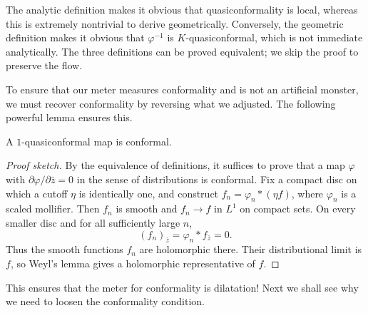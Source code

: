 \documentclass[11pt,a4paper]{article}
\begin{document}
The analytic definition makes it obvious that quasiconformality is local, whereas this is extremely nontrivial to derive geometrically. Conversely, the geometric definition makes it obvious that \(\varphi^{-1}\) is \(K\)-quasiconformal, which is not immediate analytically.
The three definitions can be proved equivalent; we skip the proof to preserve the flow.

To ensure that our meter measures conformality and is not an artificial monster, we must recover conformality by reversing what we adjusted. The following powerful lemma ensures this.
\setcounter{theorem}{39}\begin{lemma}
A \(1\)-quasiconformal map is conformal.
\end{lemma}
\begin{proof}[Proof sketch]
By the equivalence of definitions, it suffices to prove that a map \(\varphi\) with \(\partial\varphi/\partial\bar z=0\) in the sense of distributions is conformal. Fix a compact disc on which a cutoff \(\eta\) is identically one, and construct
\(f_n=\varphi_n*(\eta f)\), where \(\varphi_n\) is a scaled mollifier. Then \(f_n\) is smooth and \(f_n\to f\) in \(L^1\) on compact sets. On every smaller disc and for all sufficiently large \(n\),
\[
(f_n)_{\bar z}=\varphi_n*f_{\bar z}=0.
\]
Thus the smooth functions \(f_n\) are holomorphic there. Their distributional limit is \(f\), so Weyl's lemma gives a holomorphic representative of \(f\).
\end{proof}

This ensures that the meter for conformality is dilatation! Next we shall see why we need to loosen the conformality condition.
\end{document}
